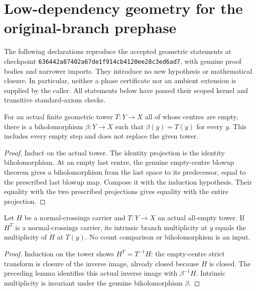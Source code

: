 \section{Low-dependency geometry for the original-branch prephase}

The following declarations reproduce the accepted geometric statements at
checkpoint \texttt{636442a87402a67de1f914cb4120ee28c3ed6ad7}, with genuine
proof bodies and narrower imports. They introduce no new hypothesis or
mathematical closure. In particular, neither a phase certificate nor an
ambient extension is supplied by the caller. All statements below have passed their scoped kernel and transitive
standard-axiom checks.

\begin{lemma}
\label{hir:original-old-branch-empty-projection}
\leanok
For an actual finite geometric tower $T:Y\to X$ all of whose centres
are empty, there is a biholomorphism $\beta:Y\to X$ such that
$\beta(y)=T(y)$ for every $y$. This includes every empty step and does
not replace the given tower.
\end{lemma}
\begin{proof}
Induct on the actual tower. The identity projection is the identity
biholomorphism. At an empty last centre, the genuine empty-centre
blowup theorem gives a biholomorphism from the last space to its
predecessor, equal to the prescribed last blowup map. Compose it with
the induction hypothesis. Their equality with the two prescribed
projections gives equality with the entire projection.
\end{proof}

\begin{lemma}
\label{hir:original-old-branch-empty-count}
\leanok
Let $H$ be a normal-crossings carrier and $T:Y\to X$ an actual
all-empty tower. If $H^T$ is a normal-crossings carrier, its intrinsic
branch multiplicity at $y$ equals the multiplicity of $H$ at $T(y)$.
No count comparison or biholomorphism is an input.
\end{lemma}
\begin{proof}
Induction on the tower shows $H^T=T^{-1}H$: the empty-centre strict
transform is closure of the inverse image, already closed because
$H$ is closed. The preceding lemma identifies this actual inverse
image with $\beta^{-1}H$. Intrinsic multiplicity is invariant under
the genuine biholomorphism $\beta$.
\end{proof}

